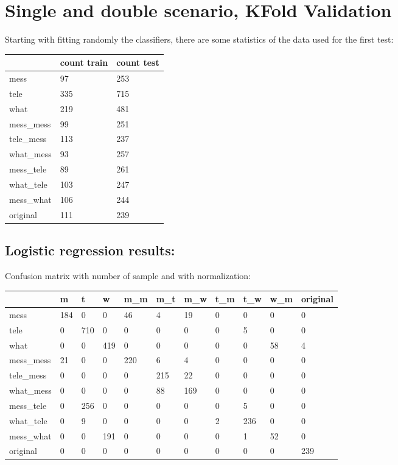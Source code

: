 

\chapter{Single and double scenario, KFold Validation}

Starting with fitting randomly the classifiers, there are some statistics of the data used for the first test: \\
 {\def\arraystretch{1.3} 
 \begin{table}[H] 
\centering 
\begin{tabular}{|l|l|l|} 
\hline 
  &count train  &count test  \\ \hline
mess  &97  &253  \\ \hline
tele  &335  &715  \\ \hline
what  &219  &481  \\ \hline
mess\_mess  &99  &251  \\ \hline
tele\_mess  &113  &237  \\ \hline
what\_mess  &93  &257  \\ \hline
mess\_tele  &89  &261  \\ \hline
what\_tele  &103  &247  \\ \hline
mess\_what  &106  &244  \\ \hline
original  &111  &239  \\ \hline
\end{tabular} 
\end{table} }
\section{Logistic regression results:} 
Confusion matrix with number of sample and with normalization:
 {\def\arraystretch{1.3} 
 \begin{table}[H] 
\centering 
\begin{tabular}{|l|l|l|l|l|l|l|l|l|l|l|} 
\hline 
  &m  &t  &w  &m\_m  &m\_t  &m\_w  &t\_m  &t\_w  &w\_m  &original  \\ \hline
mess  &184  &0  &0  &46  &4  &19  &0  &0  &0  &0  \\ \hline
tele  &0  &710  &0  &0  &0  &0  &0  &5  &0  &0  \\ \hline
what  &0  &0  &419  &0  &0  &0  &0  &0  &58  &4  \\ \hline
mess\_mess  &21  &0  &0  &220  &6  &4  &0  &0  &0  &0  \\ \hline
tele\_mess  &0  &0  &0  &0  &215  &22  &0  &0  &0  &0  \\ \hline
what\_mess  &0  &0  &0  &0  &88  &169  &0  &0  &0  &0  \\ \hline
mess\_tele  &0  &256  &0  &0  &0  &0  &0  &5  &0  &0  \\ \hline
what\_tele  &0  &9  &0  &0  &0  &0  &2  &236  &0  &0  \\ \hline
mess\_what  &0  &0  &191  &0  &0  &0  &0  &1  &52  &0  \\ \hline
original  &0  &0  &0  &0  &0  &0  &0  &0  &0  &239  \\ \hline
\end{tabular} 
\end{table} }

